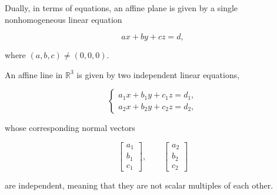 Dually, in terms of equations, an affine plane is given by a single
nonhomogeneous linear equation

\[
ax+by+cz=d,
\]

where $(a,b,c)\ne(0,0,0)$.

An affine line in $\mathbb{R}^3$ is given by two independent linear equations,

\[
\begin{cases}
a_1x+b_1y+c_1z=d_1,\\
a_2x+b_2y+c_2z=d_2,
\end{cases}
\]

whose corresponding normal vectors

\[
\begin{bmatrix}
a_1\\
b_1\\
c_1
\end{bmatrix},
\qquad
\begin{bmatrix}
a_2\\
b_2\\
c_2
\end{bmatrix}
\]

are independent, meaning that they are not scalar multiples of each other.